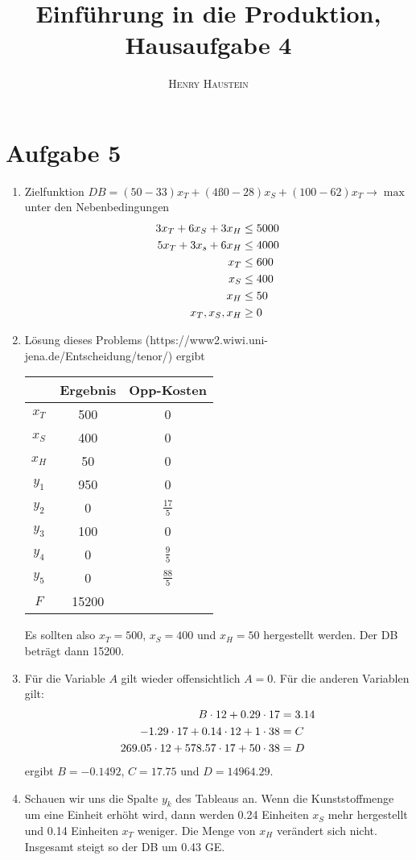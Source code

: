 \documentclass{article}
\title{\textbf{Einführung in die Produktion, Hausaufgabe 4}}
\author{\textsc{Henry Haustein}}
\date{}
\begin{document}
	\maketitle
	
	\section*{Aufgabe 5}
	\begin{enumerate}[label=(\alph*)]
		\item Zielfunktion $DB = (50-33)x_T + (4ß0-28)x_S + (100-62)x_T \to\max$ unter den Nebenbedingungen
		\begin{align}
			3 x_T + 6x_S + 3x_H &\le 5000 \notag \\
			5 x_T + 3x_s + 6x_H &\le 4000 \notag \\
			x_T &\le 600 \notag \\
			x_S &\le 400 \notag \\
			x_H &\le 50 \notag \\
			x_T,x_S,x_H &\ge 0 \notag
		\end{align}
		\item Lösung dieses Problems (https://www2.wiwi.uni-jena.de/Entscheidung/tenor/) ergibt
		\begin{center}
			\begin{tabular}{c|cc}
				& \textbf{Ergebnis} & \textbf{Opp-Kosten} \\
				\hline
				$x_T$ & 500 & 0 \\
				$x_S$ & 400 & 0 \\
				$x_H$ & 50 & 0 \\
				$y_1$ & 950 & 0 \\
				$y_2$ & 0 & $\frac{17}{5}$ \\
				$y_3$ & 100 & 0 \\
				$y_4$ & 0 & $\frac{9}{5}$ \\
				$y_5$ & 0 & $\frac{88}{5}$ \\
				$F$ & 15200 &
			\end{tabular}
		\end{center}
		Es sollten also $x_T=500$, $x_S=400$ und $x_H=50$ hergestellt werden. Der DB beträgt dann 15200.
		\item Für die Variable $A$ gilt wieder offensichtlich $A=0$. Für die anderen Variablen gilt:
		\begin{align}
			B\cdot 12 + 0.29\cdot 17 &= 3.14 \notag \\
			-1.29\cdot 17 + 0.14\cdot 12 + 1\cdot 38 &= C \notag \\
			269.05\cdot 12 + 578.57\cdot 17 + 50\cdot 38 &= D \notag
		\end{align}
		ergibt $B=-0.1492$, $C=17.75$ und $D=14964.29$.
		\item Schauen wir uns die Spalte $y_k$ des Tableaus an. Wenn die Kunststoffmenge um eine Einheit erhöht wird, dann werden 0.24 Einheiten $x_S$ mehr hergestellt und 0.14 Einheiten $x_T$ weniger. Die Menge von $x_H$ verändert sich nicht. Insgesamt steigt so der DB um 0.43 GE.
	\end{enumerate}
	
\end{document}
